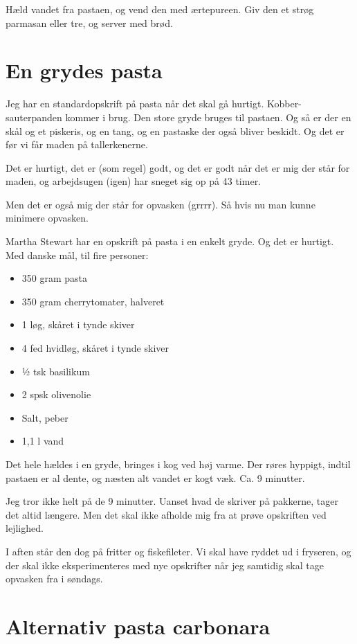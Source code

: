 \documentclass[
  letterpaper,
  DIV=11,
  numbers=noendperiod]{scrreprt}
\providecommand{\tightlist}{%
  \setlength{\itemsep}{0pt}\setlength{\parskip}{0pt}}\usepackage{longtable,booktabs,array}
\begin{document}
Hæld vandet fra pastaen, og vend den med ærtepureen. Giv den et strøg
parmasan eller tre, og server med brød.

\hypertarget{en-grydes-pasta}{%
\section{En grydes pasta}\label{en-grydes-pasta}}

Jeg har en standardopskrift på pasta når det skal gå hurtigt.
Kobber-sauterpanden kommer i brug. Den store gryde bruges til pastaen.
Og så er der en skål og et piskeris, og en tang, og en pastaske der også
bliver beskidt. Og det er før vi får maden på tallerkenerne.

Det er hurtigt, det er (som regel) godt, og det er godt når det er mig
der står for maden, og arbejdsugen (igen) har sneget sig op på 43 timer.

Men det er også mig der står for opvasken (grrrr). Så hvis nu man kunne
minimere opvasken.

Martha Stewart har en opskrift på pasta i en enkelt gryde. Og det er
hurtigt. Med danske mål, til fire personer:

\begin{itemize}
\tightlist
\item
  350 gram pasta
\item
  350 gram cherrytomater, halveret
\item
  1 løg, skåret i tynde skiver
\item
  4 fed hvidløg, skåret i tynde skiver
\item
  ½ tsk basilikum
\item
  2 spsk olivenolie
\item
  Salt, peber
\item
  1,1 l vand
\end{itemize}

Det hele hældes i en gryde, bringes i kog ved høj varme. Der røres
hyppigt, indtil pastaen er al dente, og næsten alt vandet er kogt væk.
Ca. 9 minutter.

Jeg tror ikke helt på de 9 minutter. Uanset hvad de skriver på pakkerne,
tager det altid længere. Men det skal ikke afholde mig fra at prøve
opskriften ved lejlighed.

I aften står den dog på fritter og fiskefileter. Vi skal have ryddet ud
i fryseren, og der skal ikke eksperimenteres med nye opskrifter når jeg
samtidig skal tage opvasken fra i søndags.

\hypertarget{alternativ-pasta-carbonara}{%
\section{Alternativ pasta carbonara}\label{alternativ-pasta-carbonara}}
\end{document}
